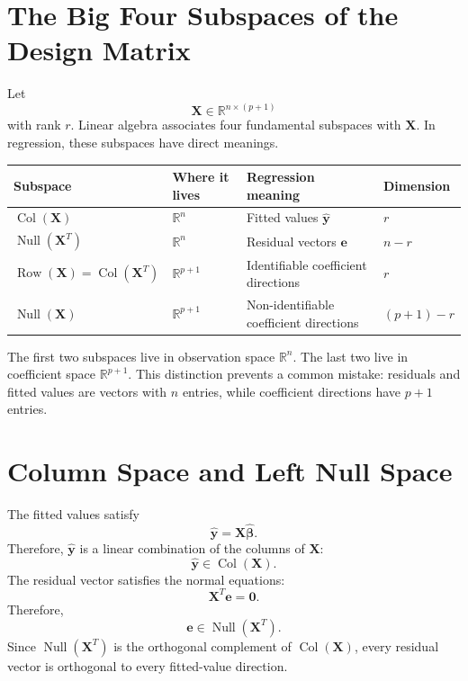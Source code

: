 \section{The Big Four Subspaces of the Design Matrix}

Let
\begin{equation}
  \mathbf{X}\in\mathbb{R}^{n\times(p+1)}
\end{equation}
with rank \(r\).  Linear algebra associates four fundamental subspaces with \(\mathbf{X}\).  In regression, these subspaces have direct meanings.

\begin{center}
\begin{tabular}{|p{}|p{}|p{}|p{}|}
\hline
\textbf{Subspace} & \textbf{Where it lives} & \textbf{Regression meaning} & \textbf{Dimension} \\
\hline
\(\operatorname{Col}(\mathbf{X})\) & \(\mathbb{R}^n\) & Fitted values \(\widehat{\mathbf{y}}\) & \(r\) \\
\hline
\(\operatorname{Null}(\mathbf{X}^T)\) & \(\mathbb{R}^n\) & Residual vectors \(\mathbf{e}\) & \(n-r\) \\
\hline
\(\operatorname{Row}(\mathbf{X})=\operatorname{Col}(\mathbf{X}^T)\) & \(\mathbb{R}^{p+1}\) & Identifiable coefficient directions & \(r\) \\
\hline
\(\operatorname{Null}(\mathbf{X})\) & \(\mathbb{R}^{p+1}\) & Non-identifiable coefficient directions & \((p+1)-r\) \\
\hline
\end{tabular}
\end{center}

The first two subspaces live in observation space \(\mathbb{R}^n\).  The last two live in coefficient space \(\mathbb{R}^{p+1}\).  This distinction prevents a common mistake: residuals and fitted values are vectors with \(n\) entries, while coefficient directions have \(p+1\) entries.

\section{Column Space and Left Null Space}

The fitted values satisfy
\begin{equation}
  \widehat{\mathbf{y}}=\mathbf{X}\widehat{\boldsymbol{\beta}}.
\end{equation}
Therefore, \(\widehat{\mathbf{y}}\) is a linear combination of the columns of \(\mathbf{X}\):
\begin{equation}
  \widehat{\mathbf{y}}\in\operatorname{Col}(\mathbf{X}).
\end{equation}
The residual vector satisfies the normal equations:
\begin{equation}
  \mathbf{X}^T\mathbf{e}=\mathbf{0}.
\end{equation}
Therefore,
\begin{equation}
  \mathbf{e}\in\operatorname{Null}(\mathbf{X}^T).
\end{equation}
Since \(\operatorname{Null}(\mathbf{X}^T)\) is the orthogonal complement of \(\operatorname{Col}(\mathbf{X})\), every residual vector is orthogonal to every fitted-value direction.

